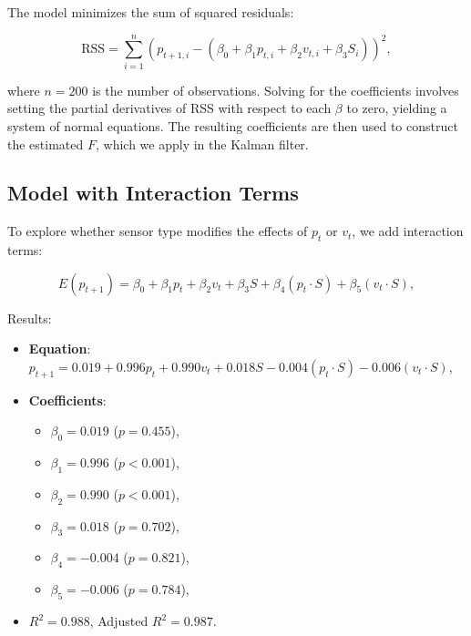 \documentclass[12pt]{article}
\begin{document}
The model minimizes the sum of squared residuals:

\begin{equation}
    \text{RSS} = \sum_{i=1}^n (p_{t+1,i} - (\beta_0 + \beta_1 p_{t,i} + \beta_2 v_{t,i} + \beta_3 S_i))^2,
    \label{eq:rss}
\end{equation}

where \( n = 200 \) is the number of observations. Solving for the coefficients involves setting the partial derivatives of RSS with respect to each \( \beta \) to zero, yielding a system of normal equations. The resulting coefficients are then used to construct the estimated \( F \), which we apply in the Kalman filter.

\subsection{Model with Interaction Terms}
\label{subsec:interaction}

To explore whether sensor type modifies the effects of \( p_t \) or \( v_t \), we add interaction terms:

\begin{equation}
    E(p_{t+1}) = \beta_0 + \beta_1 p_t + \beta_2 v_t + \beta_3 S + \beta_4 (p_t \cdot S) + \beta_5 (v_t \cdot S),
    \label{eq:interaction_model}
\end{equation}

Results:
\begin{itemize}
    \item \textbf{Equation}: \( p_{t+1} = 0.019 + 0.996 p_t + 0.990 v_t + 0.018 S - 0.004 (p_t \cdot S) - 0.006 (v_t \cdot S) \),
    \item \textbf{Coefficients}:
    \begin{itemize}
        \item \( \beta_0 = 0.019 \) (\( p = 0.455 \)),
        \item \( \beta_1 = 0.996 \) (\( p < 0.001 \)),
        \item \( \beta_2 = 0.990 \) (\( p < 0.001 \)),
        \item \( \beta_3 = 0.018 \) (\( p = 0.702 \)),
        \item \( \beta_4 = -0.004 \) (\( p = 0.821 \)),
        \item \( \beta_5 = -0.006 \) (\( p = 0.784 \)),
    \end{itemize}
    \item \( R^2 = 0.988 \), Adjusted \( R^2 = 0.987 \).
\end{itemize}
\end{document}
